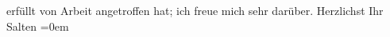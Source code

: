 \begin{ledgroupsized}[t]{13cm}
{               erfüllt von Arbeit angetroffen}{}\label{K_L03301-6h} hat; ich freue mich sehr darüber.\pend
           \pstart
           Herzlichst Ihr {\\[\baselineskip]}\spacefill\mbox{Salten}\pend
           \leftskip=0em{}
         
         \endnumbering{}\end{ledgroupsized}  \newcommand{\dateiname}{L03301}\newcommand{\titel}{Felix Salten an Arthur Schnitzler, 9. 10. 1899}\newcommand{\editorInnen}{Martin Anton Müller und Laura Untner}
      